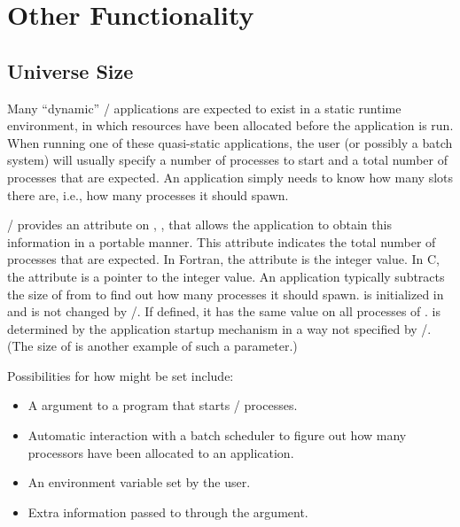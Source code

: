 \section{Other Functionality}

\subsection{Universe Size}
\label{subsec:universesize}

Many ``dynamic'' \MPI/ applications are expected to exist in a static
runtime environment, in which resources have been allocated before the
application is run.  When running one of these quasi-static applications,
the user (or possibly a batch system) will usually specify a
number of processes to start and a total number of processes that are
expected.  An application simply needs to know how many slots there
are, i.e., how many processes it should spawn.

\MPI/ provides an attribute on ,
, that allows the application to obtain
this information in a portable manner.  This attribute indicates the
total number of processes that are expected. In Fortran, the
attribute is the integer value. In C, the attribute is a pointer
to the integer value.
An application typically
subtracts the size of  from
 to find out how many processes
it should spawn.
 is initialized in 
and is not changed by \MPI/. If defined, it has the same value on
all processes of .
 is determined by the application
startup mechanism in a way not specified by \MPI/. (The size
of  is another example of such a parameter.)

Possibilities for how  might be set include:
\begin{itemize}
\item A  argument to a program that starts \MPI/ processes.
\item Automatic interaction with a batch scheduler to figure
out how many processors have been allocated to an application.
\item An environment variable set by the user.
\item Extra information passed to  through
the  argument.
\end{itemize}


